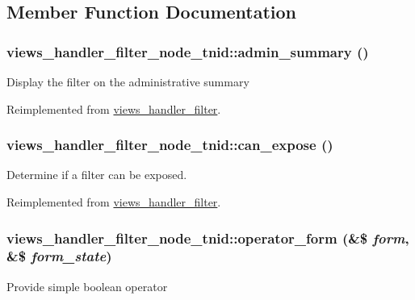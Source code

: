 \subsection{Member Function Documentation}
\hypertarget{classviews__handler__filter__node__tnid_a037932cf19297e4b8544c24747509823}{
\subsubsection[{admin\_\-summary}]{\setlength{\rightskip}{0pt plus 5cm}views\_\-handler\_\-filter\_\-node\_\-tnid::admin\_\-summary ()}}
\label{classviews__handler__filter__node__tnid_a037932cf19297e4b8544c24747509823}
Display the filter on the administrative summary 

Reimplemented from \hyperlink{classviews__handler__filter_a655263cd0b73188eec064b9a9743fe4c}{views\_\-handler\_\-filter}.\hypertarget{classviews__handler__filter__node__tnid_a9e6111d77af1aefee0b78d7b3b2c25cc}{
\subsubsection[{can\_\-expose}]{\setlength{\rightskip}{0pt plus 5cm}views\_\-handler\_\-filter\_\-node\_\-tnid::can\_\-expose ()}}
\label{classviews__handler__filter__node__tnid_a9e6111d77af1aefee0b78d7b3b2c25cc}
Determine if a filter can be exposed. 

Reimplemented from \hyperlink{classviews__handler__filter_af0e5810a2a2f194cd6af0fca9c858756}{views\_\-handler\_\-filter}.\hypertarget{classviews__handler__filter__node__tnid_a92d26c1ecccc0a2985d4195a46c7e87b}{
\subsubsection[{operator\_\-form}]{\setlength{\rightskip}{0pt plus 5cm}views\_\-handler\_\-filter\_\-node\_\-tnid::operator\_\-form (\&\$ {\em form}, \/  \&\$ {\em form\_\-state})}}
\label{classviews__handler__filter__node__tnid_a92d26c1ecccc0a2985d4195a46c7e87b}
Provide simple boolean operator 


